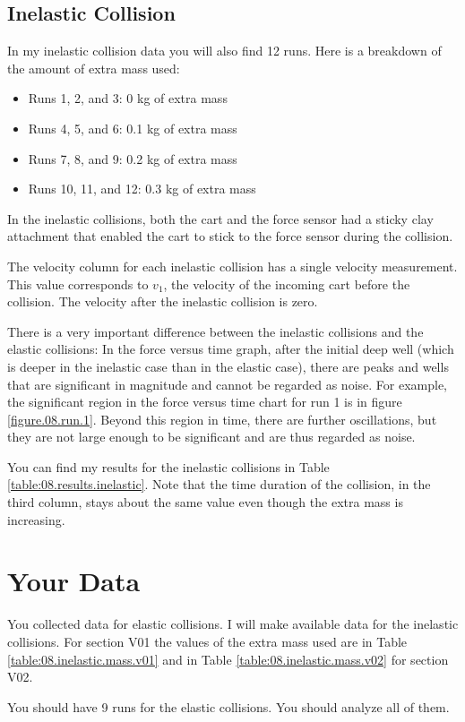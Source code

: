 \subsection{Inelastic Collision}
%
In my inelastic collision data you will also find 12 runs. Here is a breakdown of the amount of extra mass used:
\begin{itemize}
    \item Runs 1, 2, and 3: 0 kg of extra mass
    \item Runs 4, 5, and 6: 0.1 kg of extra mass
    \item Runs 7, 8, and 9: 0.2 kg of extra mass
    \item Runs 10, 11, and 12: 0.3 kg of extra mass
\end{itemize}
In the inelastic collisions, both the cart and the force sensor had a sticky clay attachment that enabled the cart to stick to the force sensor during the collision.

The velocity column for each inelastic collision has a single velocity measurement. This value corresponds to $v_{1}$, the velocity of the incoming cart before the collision. The velocity after the inelastic collision is zero.

There is a very important difference between the inelastic collisions and the elastic collisions: In the force versus time graph, after the initial deep well (which is deeper in the inelastic case than in the elastic case), there are peaks and wells that are significant in magnitude and cannot be regarded as noise. For example, the significant region in the force versus time chart for run 1 is in figure \ref{figure.08.run.1}. Beyond this region in time, there are further oscillations, but they are not large enough to be significant and are thus regarded as noise.

You can find my results for the inelastic collisions in Table \ref{table:08.results.inelastic}. Note that the time duration of the collision, in the third column, stays about the same value even though the extra mass is increasing.
%
\section{Your Data}
%
You collected data for elastic collisions. I will make available data for the inelastic collisions. For section V01 the values of the extra mass used are in Table \ref{table:08.inelastic.mass.v01} and in Table \ref{table:08.inelastic.mass.v02} for section V02.

You should have 9 runs for the elastic collisions. You should analyze all of them.

